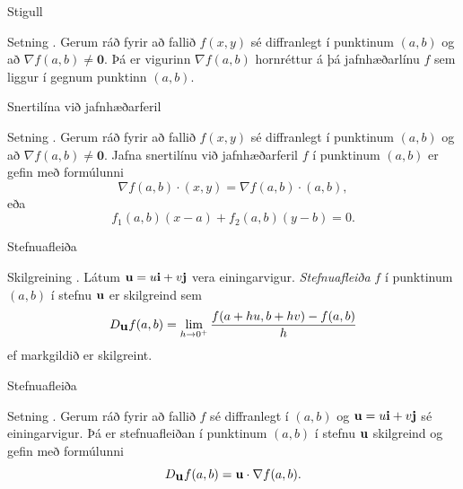 \begin{frame}{Stigull} 

\begin {block}{Setning \kaflanr.}
  Gerum ráð fyrir að fallið $f(x,y)$ sé
diffranlegt í punktinum $(a,b)$ og að $\nabla f(a,b) \neq \mathbf{0}$.  Þá er vigurinn $\nabla f(a,b)$ 
hornréttur á þá jafnhæðarlínu $f$ sem liggur í gegnum punktinn $(a,b)$.
\end{block}

\end{frame}





\begin{frame}{Snertilína við jafnhæðarferil} 

\begin {block}{Setning \kaflanr.}
  Gerum ráð fyrir að fallið $f(x,y)$ sé
diffranlegt í punktinum $(a,b)$ og að $\nabla f(a,b) \neq \mathbf{0}$.  Jafna snertilínu við jafnhæðarferil $f$ í punktinum $(a,b)$ er gefin
með formúlunni 
$$\nabla f(a,b)\cdot (x,y)=\nabla f(a,b)\cdot (a,b),$$
eða 
$$f_1(a,b)(x-a)+f_2(a,b)(y-b)=0.$$
\end{block}

\end{frame}

\begin{frame}{Stefnuafleiða} 

\begin {block}{Skilgreining \kaflanr.}
 Látum $\mbox{${\bf u}$}=u\mbox{${\bf i}$}+v\mbox{${\bf j}$}$ vera einingarvigur.  {\em
  Stefnuafleiða } $f$ í punktinum $(a,b)$ í stefnu $\mbox{${\bf u}$}$ er skilgreind
  sem 
$$D_{\mbox{${\bf u}$}}f(a,b)=\lim_{h\rightarrow 0^+}\frac{f(a+hu, b+hv)-f(a,b)}{h}$$
ef markgildið er skilgreint.  
\end{block}

\end{frame}

\begin{frame}{Stefnuafleiða} 

\begin {block}{Setning \kaflanr.}
Gerum ráð fyrir að fallið $f$ sé diffranlegt í
$(a,b)$ og $\mbox{${\bf u}$}=u\mbox{${\bf i}$}+v\mbox{${\bf j}$}$ sé einingarvigur.  Þá er stefnuafleiðan í
punktinum $(a,b)$ í stefnu $\mbox{${\bf u}$}$ skilgreind og gefin með formúlunni
$$D_{\mbox{${\bf u}$}}f(a,b)=\mbox{${\bf u}$}\cdot \nabla f(a,b).$$
\end{block}

\end{frame}

